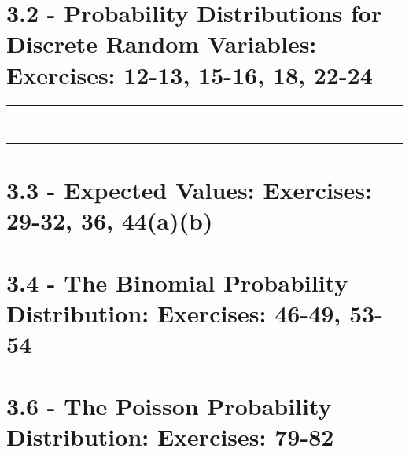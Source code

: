 \documentclass{homework}
\begin{document}
\maketitle

\section*{3.2 - Probability Distributions for Discrete Random Variables: \newline 
Exercises: 12-13, 15-16, 18, 22-24}
\hrule 

\newpage

\newpage

\newpage 

\newpage

\newpage 

\newpage

\newpage
 \\ \hrule 

\newpage 

\section*{3.3 - Expected Values: \newline 
Exercises: 29-32, 36, 44(a)(b)}

\newpage 

\newpage






\section*{3.4 - The Binomial Probability Distribution: \newline 
Exercises: 46-49, 53-54}








\section*{3.6 - The Poisson Probability Distribution: \newline 
Exercises: 79-82}




\end{document}
